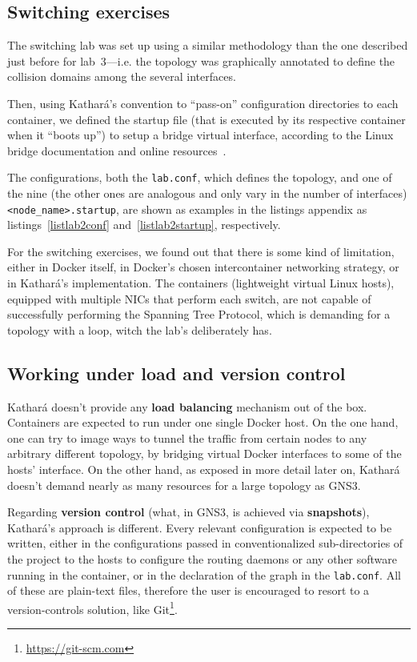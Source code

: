 \subsection{Switching exercises}

The switching lab was set up using a similar methodology than the one described just before for lab~3---i.e. the topology was graphically annotated to define the collision domains among the several interfaces.

Then, using Kathará's convention to ``pass-on'' configuration directories to each container, we defined the startup file (that is executed by its respective container when it ``boots up'') to setup a bridge virtual interface, according to the Linux bridge documentation and online resources~\cite{brctlman,howtobridgelinux}.

The configurations, both the \texttt{lab.conf}, which defines the topology, and one of the nine (the other ones are analogous and only vary in the number of interfaces) \texttt{<node\_name>.startup}, are shown as examples in the listings appendix as listings~\ref{listlab2conf} and~\ref{listlab2startup}, respectively.

For the switching exercises, we found out that there is some kind of limitation, either in Docker itself, in Docker's chosen intercontainer networking strategy, or in Kathará's implementation.
The containers (lightweight virtual Linux hosts), equipped with multiple NICs that perform each switch, are not capable of successfully performing the Spanning Tree Protocol, which is demanding for a topology with a loop, witch the lab's deliberately has.  %

\subsection{Working under load and version control}

Kathará doesn't provide any \textbf{load balancing} mechanism out of the box.
Containers are expected to run under one single Docker host.
On the one hand, one can try to image ways to tunnel the traffic from certain nodes to any arbitrary different topology, by bridging virtual Docker interfaces to some of the hosts' interface.
On the other hand, as exposed in more detail later on, Kathará doesn't demand nearly as many resources for a large topology as GNS3.

Regarding \textbf{version control} (what, in GNS3, is achieved via \textbf{snapshots}), Kathará's approach is different.
Every relevant configuration is expected to be written, either in the configurations passed in conventionalized sub-directories of the project to the hosts to configure the routing daemons or any other software running in the container, or in the declaration of the graph in the \texttt{lab.conf}.
All of these are plain-text files, therefore the user is encouraged to resort to a version-controls solution, like Git\footnote{\url{https://git-scm.com}}.

